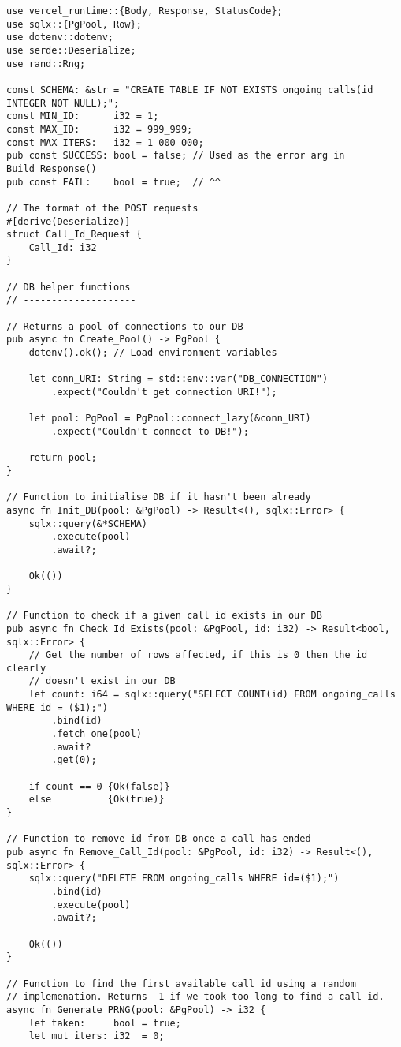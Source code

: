 \begin{verbatim}
use vercel_runtime::{Body, Response, StatusCode};
use sqlx::{PgPool, Row};
use dotenv::dotenv;
use serde::Deserialize;
use rand::Rng;

const SCHEMA: &str = "CREATE TABLE IF NOT EXISTS ongoing_calls(id INTEGER NOT NULL);";
const MIN_ID:      i32 = 1;
const MAX_ID:      i32 = 999_999;
const MAX_ITERS:   i32 = 1_000_000;
pub const SUCCESS: bool = false; // Used as the error arg in Build_Response()
pub const FAIL:    bool = true;  // ^^

// The format of the POST requests
#[derive(Deserialize)]
struct Call_Id_Request {
    Call_Id: i32
}

// DB helper functions
// --------------------

// Returns a pool of connections to our DB
pub async fn Create_Pool() -> PgPool {
    dotenv().ok(); // Load environment variables

    let conn_URI: String = std::env::var("DB_CONNECTION")
        .expect("Couldn't get connection URI!");

    let pool: PgPool = PgPool::connect_lazy(&conn_URI)
        .expect("Couldn't connect to DB!");

    return pool;
}

// Function to initialise DB if it hasn't been already
async fn Init_DB(pool: &PgPool) -> Result<(), sqlx::Error> {
    sqlx::query(&*SCHEMA)
        .execute(pool)
        .await?;

    Ok(())
}

// Function to check if a given call id exists in our DB
pub async fn Check_Id_Exists(pool: &PgPool, id: i32) -> Result<bool, sqlx::Error> {
    // Get the number of rows affected, if this is 0 then the id clearly
    // doesn't exist in our DB
    let count: i64 = sqlx::query("SELECT COUNT(id) FROM ongoing_calls WHERE id = ($1);")
        .bind(id)
        .fetch_one(pool)
        .await?
        .get(0);

    if count == 0 {Ok(false)}
    else          {Ok(true)}
}

// Function to remove id from DB once a call has ended
pub async fn Remove_Call_Id(pool: &PgPool, id: i32) -> Result<(), sqlx::Error> {
    sqlx::query("DELETE FROM ongoing_calls WHERE id=($1);")
        .bind(id)
        .execute(pool)
        .await?;

    Ok(())
}

// Function to find the first available call id using a random
// implemenation. Returns -1 if we took too long to find a call id.
async fn Generate_PRNG(pool: &PgPool) -> i32 {
    let taken:     bool = true;
    let mut iters: i32  = 0;


\end{verbatim}
